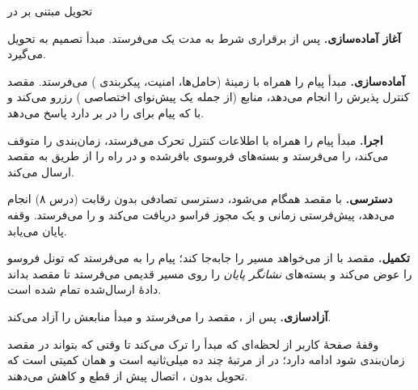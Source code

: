 \documentclass[11pt,a4paper]{article}
\begin{document}
\begin{procedurebox}{تحویل مبتنی بر  در }\label{proc:x2}
\begin{steps}
  \item \textbf{آغاز آماده‌سازی.}  پس از برقراری شرط  به مدت  یک
         می‌فرستد.  مبدأ تصمیم به تحویل می‌گیرد.
  \item \textbf{آماده‌سازی.} مبدأ پیام   را همراه با زمینهٔ 
        (حامل‌ها، امنیت، پیکربندی ) می‌فرستد. مقصد کنترل پذیرش را انجام می‌دهد، منابع
        (از جمله یک پیش‌نوای اختصاصی ) رزرو می‌کند و با 
        که پیام  برای  را در بر دارد پاسخ می‌دهد.
  \item \textbf{اجرا.} مبدأ پیام  را همراه با اطلاعات کنترل تحرک
        می‌فرستد، زمان‌بندی  را متوقف می‌کند،  را می‌فرستد و بسته‌های
        فروسوی بافرشده و در راه را از طریق  به مقصد ارسال می‌کند.
  \item \textbf{دسترسی.}  با مقصد همگام می‌شود، دسترسی تصادفی بدون رقابت (درس ۸) انجام
        می‌دهد، پیش‌فرستی زمانی و یک مجوز فراسو دریافت می‌کند و 
        را می‌فرستد. وقفه پایان می‌یابد.
  \item \textbf{تکمیل.} مقصد با   از  می‌خواهد مسیر را جابه‌جا
        کند؛  پیام  را به  می‌فرستد که تونل فروسو را عوض
        می‌کند و بسته‌های \emph{نشانگر پایان} را روی مسیر قدیمی می‌فرستد تا مقصد بداند دادهٔ ارسال‌شده
        تمام شده است.
  \item \textbf{آزادسازی.} پس از ، مقصد  را
        می‌فرستد و مبدأ منابعش را آزاد می‌کند.
\end{steps}
\end{procedurebox}

\begin{acnfigure}
  \caption{تحویل مبتنی بر  در  (\cref{proc:x2}). پیکان‌های فیروزه‌ای: ارسال دادهٔ
  صفحهٔ کاربر و نشانگر پایان.}
  \label{fig:x2}
\end{acnfigure}

وقفهٔ صفحهٔ کاربر از لحظه‌ای که  مبدأ را ترک می‌کند تا وقتی که بتواند در مقصد زمان‌بندی
شود ادامه دارد؛ در  از مرتبهٔ چند ده میلی‌ثانیه است و همان کمیتی است که تحویل بدون
، اتصال پیش از قطع و  کاهش می‌دهند.
\end{document}
